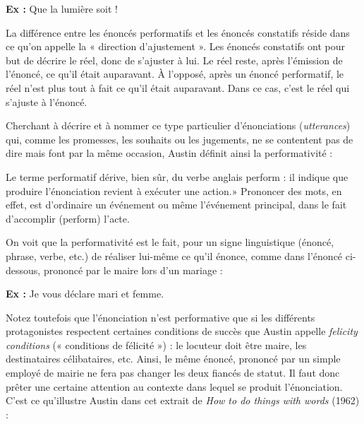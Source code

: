\textbf{Ex :} Que la lumière soit !

La différence entre les énoncés performatifs et les énoncés constatifs réside dans ce qu’on appelle la « direction d’ajustement ». Les énoncés constatifs ont pour but de décrire le réel, donc de s’ajuster à lui. Le réel reste, après l’émission de l’énoncé, ce qu’il était auparavant. À l’opposé, après un énoncé performatif, le réel n’est plus tout à fait ce qu’il était auparavant. Dans ce cas, c’est le réel qui s’ajuste à l’énoncé.

Cherchant à décrire et à nommer ce type particulier d’énonciations (\textit{utterances}) qui, comme les promesses, les souhaits ou les jugements, ne se contentent pas de dire mais font par la même occasion, Austin définit ainsi la performativité :

\begin{lecture}{}
Le terme performatif dérive, bien sûr, du verbe anglais perform : il indique que produire l’énonciation revient à exécuter une action.» Prononcer des mots, en effet, est d’ordinaire un événement ou même l’événement principal, dans le fait d’accomplir (perform) l’acte.
\end{lecture}

On voit que la performativité est le fait, pour un signe linguistique (énoncé, phrase, verbe, etc.) de réaliser lui-même ce qu’il énonce, comme dans l’énoncé ci-dessous, prononcé par le maire lors d’un mariage :

\textbf{Ex :} Je vous déclare mari et femme.

Notez toutefois que l’énonciation n’est performative que si les différents protagonistes respectent certaines conditions de succès que Austin appelle \textit{felicity conditions} (« conditions de félicité ») : le locuteur doit être maire, les destinataires célibataires, etc. Ainsi, le même énoncé, prononcé par un simple employé de mairie ne fera pas changer les deux fiancés de statut. Il faut donc prêter une certaine attention au contexte dans lequel se produit l’énonciation. C’est ce qu’illustre Austin dans cet extrait de \textit{How to do things with words} (1962) :

